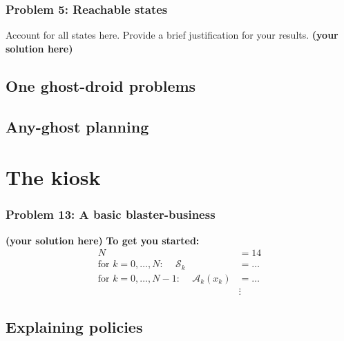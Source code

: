 \documentclass[12pt,twoside]{article}
\newcommand\redt[1]{ {\textcolor[rgb]{0.60, 0.00, 0.00}{\textbf{ #1} } } }
\newcommand{\yoursolution}{ \redt{(your solution here) } }
\begin{document}
\subsubsection*{{\color{red}Problem 5:  Reachable states}}
	
Account for all states here. Provide a brief justification for your results. 
		\yoursolution 	
	
\subsection{One ghost-droid problems}
\subsection{Any-ghost planning}
\section{The kiosk}
\subsubsection*{{\color{red}Problem 13:  A basic blaster-business}}

\yoursolution 	
\redt{ To get you started: \begin{align}
	N & = 14 \\
	\mbox{for $k=0,\dots,N$: }\quad	\mathcal{S}_k & = \dots \\
	\mbox{for $k=0,\dots,N-1$: }\quad \mathcal{A}_k(x_k) & = \dots \\
	 & \vdots 
\end{align} }

\subsection{Explaining policies}
\end{document}
